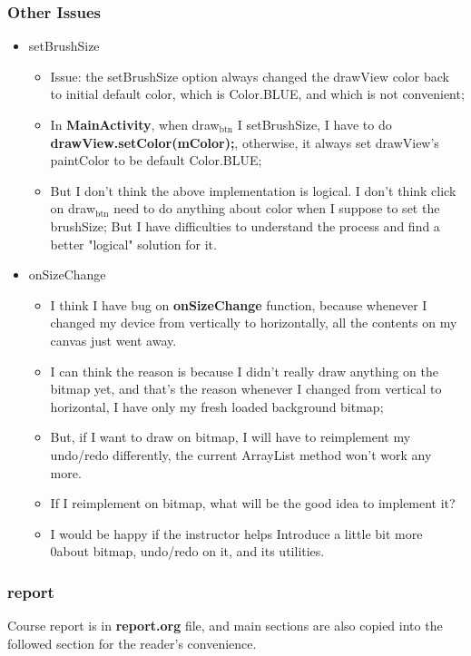 \documentclass[9pt,b5paper]{article}
\begin{document}
\subsubsection{Other Issues}
\label{sec-6-2-4}
\begin{itemize}
\item setBrushSize 
\begin{itemize}
\item Issue: the setBrushSize option always changed the drawView color back to initial default color, which is Color.BLUE, and which is not convenient;
\item In \textbf{MainActivity}, when draw$_{\text{btn}}$ I setBrushSize, I have to do \textbf{drawView.setColor(mColor);}, otherwise, it always set drawView's paintColor to be default Color.BLUE;
\item But I don't think the above implementation is logical. I don't think click on draw$_{\text{btn}}$ need to do anything about color when I suppose to set the brushSize; But I have difficulties to understand the process and find a better "logical" solution for it.
\end{itemize}
\item onSizeChange
\begin{itemize}
\item I think I have bug on \textbf{onSizeChange} function, because whenever I changed my device from vertically to horizontally, all the contents on my canvas just went away.
\item I can think the reason is because I didn't really draw anything on the bitmap yet, and that's the reason whenever I changed from vertical to horizontal, I have only my fresh loaded background bitmap;
\item But, if I want to draw on bitmap, I will have to reimplement my undo/redo differently, the current ArrayList method won't work any more.
\item If I reimplement on bitmap, what will be the good idea to implement it?
\item I would be happy if the instructor helps Introduce a little bit more 0about bitmap, undo/redo on it, and its utilities.
\end{itemize}
\end{itemize}
\subsubsection{report}
\label{sec-6-2-5}
Course report is in \textbf{report.org} file, and main sections are also copied into the followed section for the reader's convenience. 
\end{document}
